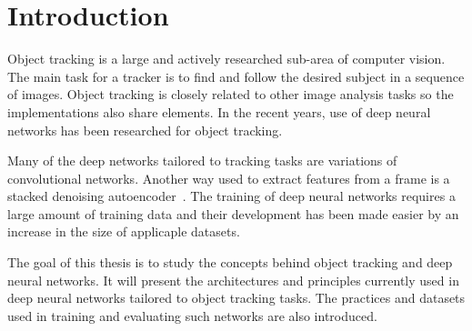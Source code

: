 \section{Introduction}
Object tracking is a large and actively researched sub-area of computer vision. The
main task for a tracker is to find and follow the desired subject in a sequence of
images. Object tracking is closely related to other image analysis tasks so the
implementations also share elements. In the recent years, use of deep neural networks
has been researched for object tracking.

Many of the deep networks tailored to tracking tasks are variations of convolutional
networks. Another way used to extract features from a frame is a stacked denoising
autoencoder~\cite{LEARNING_DEEP}. The training of deep neural networks requires a
large amount of training data and their development has been made easier by an increase
in the size of applicaple datasets.

The goal of this thesis is to study the concepts behind object tracking and deep neural
networks. It will present the architectures and principles currently used in deep
neural networks tailored to object tracking tasks. The practices and datasets used
in training and evaluating such networks are also introduced.
